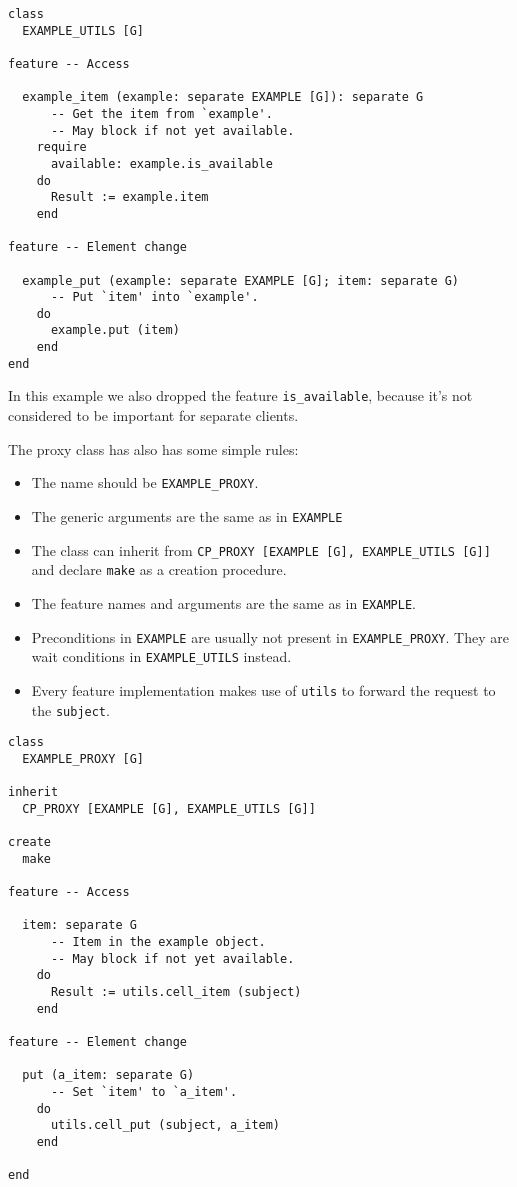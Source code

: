 \documentclass[a4paper,10pt]{report}
\begin{document}
\begin{lstlisting}
class
  EXAMPLE_UTILS [G]
  
feature -- Access

  example_item (example: separate EXAMPLE [G]): separate G
      -- Get the item from `example'.
      -- May block if not yet available.
    require
      available: example.is_available
    do
      Result := example.item
    end

feature -- Element change
 
  example_put (example: separate EXAMPLE [G]; item: separate G)
      -- Put `item' into `example'.
    do
      example.put (item)
    end
end
\end{lstlisting}

In this example we also dropped the feature \lstinline!is_available!, because it's not considered to be important for separate clients.

The proxy class has also has some simple rules:

 \begin{itemize}
  \item The name should be \lstinline!EXAMPLE_PROXY!.
  \item The generic arguments are the same as in \lstinline!EXAMPLE!
  \item The class can inherit from \lstinline!CP_PROXY [EXAMPLE [G], EXAMPLE_UTILS [G]]! and declare \lstinline!make! as a creation procedure.
  \item The feature names and arguments are the same as in \lstinline!EXAMPLE!.
  \item Preconditions in \lstinline!EXAMPLE! are usually not present in \lstinline!EXAMPLE_PROXY!. They are wait conditions in \lstinline!EXAMPLE_UTILS! instead.
  \item Every feature implementation makes use of \lstinline!utils! to forward the request to the \lstinline!subject!.
 \end{itemize}

\begin{lstlisting}
class
  EXAMPLE_PROXY [G]

inherit
  CP_PROXY [EXAMPLE [G], EXAMPLE_UTILS [G]]

create
  make
  
feature -- Access

  item: separate G
      -- Item in the example object.
      -- May block if not yet available.
    do
      Result := utils.cell_item (subject)
    end

feature -- Element change

  put (a_item: separate G)
      -- Set `item' to `a_item'.
    do
      utils.cell_put (subject, a_item)
    end

end
\end{lstlisting}
 
\end{document}
